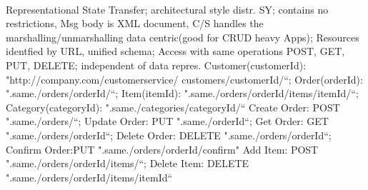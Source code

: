 \\
Representational State Transfer;
architectural style distr. SY;
contains no restrictions, Msg body is XML document, 
C/S handles the marshalling/unmarshalling
\btext{++:}
data centric(good for CRUD heavy Apps);
Resources identfied by URL, unified schema;
Access with same operations POST, GET, PUT, DELETE;
independent of data repres.
Customer(customerId):
"http://company.com/customerservice/ customers/{customerId}/“;
Order(orderId):
".same./orders/{orderId}/“;
Item(itemId):
".same./orders/{orderId}/items/{itemId}/“;
Category(categoryId):
".same./categories/{categoryId}/“
Create Order: POST ".same./orders/“;
Update Order: PUT ".same./{orderId}“;
Get Order: GET ".same./orders/{orderId}“;
Delete Order: DELETE ".same./orders/{orderId}“;
Confirm Order:PUT ".same./orders/{orderId}/confirm"
Add Item: POST ".same./orders/{orderId}/items/“;
Delete Item: DELETE ".same./orders/{orderId}/items/{itemId}“